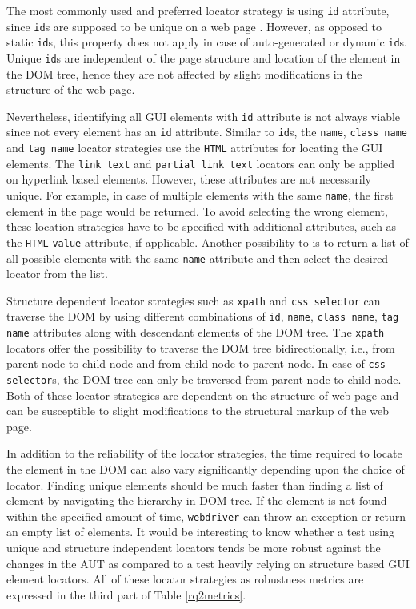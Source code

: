 The most commonly used and preferred locator strategy is using \texttt{id} attribute, since \texttt{id}s are supposed to be unique on a web page \cite{W3CIDs}. However, as opposed to static \texttt{id}s, this property does not apply in case of auto-generated or dynamic \texttt{id}s. Unique \texttt{id}s are independent of the page structure and location of the element in the DOM tree, hence they are not affected by slight modifications in the structure of the web page. 

Nevertheless, identifying all GUI elements with \texttt{id} attribute is not always viable since not every element has an \texttt{id} attribute. Similar to \texttt{id}s, the \texttt{name}, \texttt{class name} and \texttt{tag name} locator strategies use the \texttt{HTML} attributes for locating the GUI elements. 
The \texttt{link text} and  \texttt{partial link text} locators can only be applied on hyperlink based elements. However, these attributes are not necessarily unique. For example, in case of multiple elements with the same \texttt{name}, the first element in the page would be returned. To avoid selecting the wrong element, these location strategies have to be specified with additional attributes, such as the \texttt{HTML} \texttt{value} attribute, if applicable. Another possibility to is to return a list of all possible elements with the same \texttt{name} attribute and then select the desired locator from the list. 

Structure dependent locator strategies such as \texttt{xpath} and \texttt{css selector} can traverse the DOM by using different combinations of \texttt{id}, \texttt{name}, \texttt{class name}, \texttt{tag name} attributes along with descendant elements of the DOM tree. The \texttt{xpath} locators offer the possibility to traverse the DOM tree bidirectionally, i.e., from parent node to child node and from child node to parent node. In case of \texttt{css selector}s, the DOM tree can only be traversed from parent node to child node. Both of these locator strategies are dependent on the structure of web page and can be susceptible to slight modifications to the structural markup of the web page.  
 
In addition to the reliability of the locator strategies, the time required to locate the element in the DOM can also vary significantly depending upon the choice of locator. Finding unique elements should be much faster than finding a list of element by navigating the hierarchy in DOM tree. If the element is not found within the specified amount of time, \texttt{webdriver} can throw an exception or return an empty list of elements. It would be interesting to know whether a test using unique and structure independent locators tends be more robust against the changes in the AUT as compared to a test heavily relying on structure based GUI element locators. All of these locator strategies as robustness metrics are expressed in the third part of Table \ref{rq2metrics}.  

